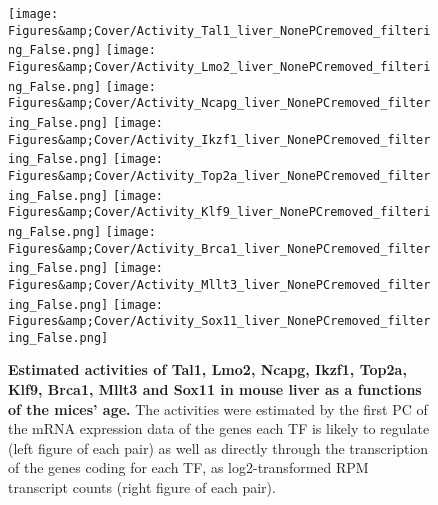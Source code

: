 \begin{figure}
    \centering
    \texttt{[image: Figures\&amp;Cover/Activity\_Tal1\_liver\_NonePCremoved\_filtering\_False.png]}
    \hspace{0.25cm}
    \vspace{0.25cm}
    \texttt{[image: Figures\&amp;Cover/Activity\_Lmo2\_liver\_NonePCremoved\_filtering\_False.png]}
    \vspace{0.25cm}
    \texttt{[image: Figures\&amp;Cover/Activity\_Ncapg\_liver\_NonePCremoved\_filtering\_False.png]}
    \hspace{0.25cm}
    \texttt{[image: Figures\&amp;Cover/Activity\_Ikzf1\_liver\_NonePCremoved\_filtering\_False.png]}
    \vspace{0.25cm}
    \texttt{[image: Figures\&amp;Cover/Activity\_Top2a\_liver\_NonePCremoved\_filtering\_False.png]}
    \hspace{0.25cm}
    \texttt{[image: Figures\&amp;Cover/Activity\_Klf9\_liver\_NonePCremoved\_filtering\_False.png]}
    \vspace{0.25cm}
    \texttt{[image: Figures\&amp;Cover/Activity\_Brca1\_liver\_NonePCremoved\_filtering\_False.png]}
    \hspace{0.25cm}
    \texttt{[image: Figures\&amp;Cover/Activity\_Mllt3\_liver\_NonePCremoved\_filtering\_False.png]}
    \vspace{0.25cm}
    \texttt{[image: Figures\&amp;Cover/Activity\_Sox11\_liver\_NonePCremoved\_filtering\_False.png]}
    \caption{\textbf{Estimated activities of Tal1, Lmo2, Ncapg, Ikzf1, Top2a, Klf9, Brca1, Mllt3 and Sox11 in mouse liver as a functions of the mices' age.} The activities were estimated by the first \ac{PC} of the mRNA expression data of the genes each \ac{TF} is likely to regulate (left figure of each pair) as well as directly through the transcription of the genes coding for each \ac{TF}, as log2-transformed \ac{RPM} transcript counts (right figure of each pair).}
    \label{fig:LiverEsts1}
\end{figure}

